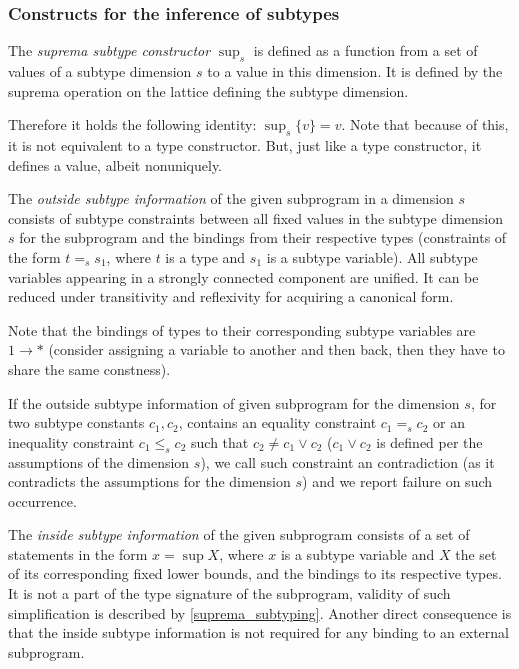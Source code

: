 \subsubsection{Constructs for the inference of subtypes}
\label{sec:iSubConstr}

The \emph{suprema subtype constructor} $\sup_s$ is defined as a function from a set of values of a subtype dimension $s$ to a value in this dimension. It is defined by the suprema operation on the lattice defining the subtype dimension.

Therefore it holds the following identity: $\sup_s \{v\} = v$. Note that because of this, it is not equivalent to a type constructor. But, just like a type constructor, it defines a value, albeit nonuniquely.

The \emph{outside subtype information }of the given subprogram in a dimension $s$ consists of subtype constraints between all fixed values in the subtype dimension $s$ for the subprogram and the bindings from their respective types (constraints of the form $t =_s s_1$, where $t$ is a type and $s_1$ is a subtype variable). All subtype variables appearing in a strongly connected component are unified. It can be reduced under transitivity and reflexivity for acquiring a canonical form.

Note that the bindings of types to their corresponding subtype variables are $1 \to \ast$ (consider assigning a variable to another and then back, then they have to share the same constness).

\begin{remark}
    \label{def:contra}
    If the outside subtype information of given subprogram for the dimension $s$, for two subtype constants $c_1, c_2$, contains an equality constraint $c_1 =_s c_2$ or an inequality constraint $c_1 \leq_s c_2$ such that $c_2 \neq c_1 \lor c_2$ ($c_1 \lor c_2$ is defined per the assumptions of the dimension $s$), we call such constraint an contradiction (as it contradicts the assumptions for the dimension $s$) and we report failure on such occurrence.
\end{remark}

The \emph{inside subtype information} of the given subprogram consists of a set of statements in the form $x = \sup X$, where $x$ is a subtype variable and $X$ the set of its corresponding fixed lower bounds, and the bindings to its respective types. It is not a part of the type signature of the subprogram, validity of such simplification is described by \cref{suprema_subtyping}. Another direct consequence is that the inside subtype information is not required for any binding to an external subprogram.

